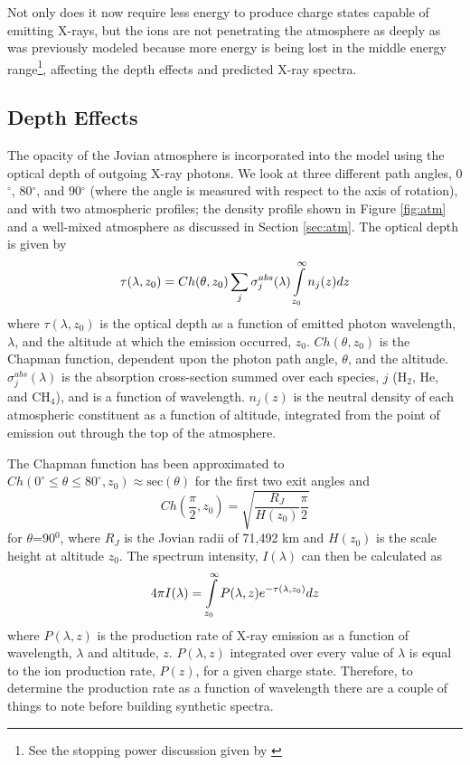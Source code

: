 \documentclass[draft]{agujournal2018}
\begin{document}
Not only does it now require less energy to produce charge states capable of emitting X-rays, but the ions are not penetrating the atmosphere as deeply as was previously modeled because more energy is being lost in the middle energy range\footnote{See the stopping power discussion given by \citet{schultz2018}}, affecting the depth effects and predicted X-ray spectra.

\subsection{Depth Effects}

The opacity of the Jovian atmosphere is incorporated into the model using the optical depth of outgoing X-ray photons.
We look at three different path angles, 0$^{\circ}$, 80$^{\circ}$, and 90$^{\circ}$ (where the angle is measured with respect to the axis of rotation), and with two atmospheric profiles; the density profile shown in Figure \ref{fig:atm} and a well-mixed atmosphere as discussed in Section \ref{sec:atm}.
The optical depth is given by
\begin{equation}
    \tau(\lambda,z_{0})=Ch(\theta,z_{0})\sum_{j}\sigma_{j}^{abs}(\lambda)\int\displaylimits_{z_{0}}^{\infty}n_{j}(z)dz
    \label{eqn:tau}
\end{equation}
where $\tau(\lambda,z_{0})$ is the optical depth as a function of emitted photon wavelength, $\lambda$, and the altitude at which the emission occurred, $z_{0}$.
$Ch(\theta,z_{0})$ is the Chapman function, dependent upon the photon path angle, $\theta$, and the altitude.
$\sigma_j^{abs}(\lambda)$ is the absorption cross-section summed over each species, $j$ (H$_2$, He, and CH$_4$), and is a function of wavelength.
$n_j(z)$ is the neutral density of each atmospheric constituent as a function of altitude, integrated from the point of emission out through the top of the atmosphere.

The Chapman function has been approximated to $Ch(0^{\circ} \leq \theta \leq 80^{\circ},z_{0}) \approx \mathrm{sec}(\theta)$ for the first two exit angles and
\begin{equation}
    Ch(\frac{\pi}{2},z_{0})=\sqrt{\frac{R_J}{H(z_0)}\frac{\pi}{2}}
    \label{eqn:Chap}
\end{equation}
for $\theta$=90$^{0}$, where $R_J$ is the Jovian radii of 71,492 km and $H(z_0)$ is the scale height at altitude $z_0$.
The spectrum intensity, $I(\lambda)$ can then be calculated as
\begin{equation}
    4\pi I(\lambda)=\int\displaylimits_{z_0}^{\infty}P(\lambda,z)e^{-\tau(\lambda,z_0)}dz
    \label{eqn:I}
\end{equation}
where $P(\lambda,z)$ is the production rate of X-ray emission as a function of wavelength, $\lambda$ and altitude, $z$.
$P(\lambda,z)$ integrated over every value of $\lambda$ is equal to the ion production rate, $P(z)$, for a given charge state.
Therefore, to determine the production rate as a function of wavelength there are a couple of things to note before building synthetic spectra.
\end{document}
